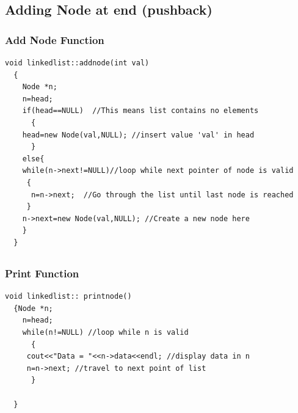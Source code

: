 \documentclass{beamer}
\newtheorem{Key points}{Key points}
\newcommand\Fontviaa{\fontsize{8}{7.2}\selectfont}
\begin{document}
\subsection{Adding Node at end (pushback)}
\begin{frame}[fragile]
  \frametitle{Add Node Function}
\Fontviaa
\begin{lstlisting}
void linkedlist::addnode(int val)
  {
    Node *n;
    n=head;
    if(head==NULL)  //This means list contains no elements
      {
	head=new Node(val,NULL); //insert value 'val' in head
      }
    else{
    while(n->next!=NULL)//loop while next pointer of node is valid
     {
      n=n->next;  //Go through the list until last node is reached
     }
    n->next=new Node(val,NULL); //Create a new node here
    }
  }
\end{lstlisting}
\end{frame}
\subsection{}
\begin{frame}[fragile]
  \frametitle{Print Function}
\Fontviaa
\begin{lstlisting}
void linkedlist:: printnode()
  {Node *n;
    n=head;
    while(n!=NULL) //loop while n is valid 
      {
     cout<<"Data = "<<n->data<<endl; //display data in n
     n=n->next;	//travel to next point of list
      }

  }
\end{lstlisting}
\end{frame}
\end{document}
